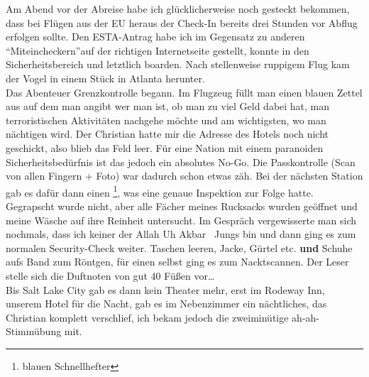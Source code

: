 Am Abend vor der Abreise habe ich glücklicherweise noch gesteckt bekommen, dass bei Flügen aus der EU heraus der Check-In bereits drei Stunden vor Abflug erfolgen sollte.
Den ESTA-Antrag habe ich \textendash im Gegensatz zu anderen \textquotedblleft Mit\-ein\-checkern\textquotedblright \textendash auf der richtigen Internetseite gestellt, konnte in den Sicherheitsbereich und letztlich boarden.
Nach stellenweise ruppigem Flug kam der Vogel in einem Stück in Atlanta herunter.\\

Das Abenteuer Grenzkontrolle begann.
Im Flugzeug füllt man einen blauen Zettel aus auf dem man angibt wer man ist, ob man zu viel Geld dabei hat, man terroristischen Aktivitäten nachgehe möchte und am wichtigsten, wo man nächtigen wird.
Der Christian hatte mir die Adresse des Hotels noch nicht geschickt, also blieb das Feld leer.
Für eine Nation mit einem paranoiden Sicherheitsbedürfnis ist das jedoch ein absolutes No-Go.
Die Passkontrolle (Scan von allen Fingern + Foto) war dadurch schon etwas zäh.
Bei der nächsten Station gab es dafür dann einen \footnote{blauen Schnellhefter}, was eine genaue Inspektion zur Folge hatte.
Gegrapscht wurde nicht, aber alle Fächer meines Rucksacks wurden geöffnet und meine Wäsche auf ihre Reinheit untersucht.
Im Gespräch vergewisserte man sich nochmals, dass ich keiner der \glqq Allah Uh Akbar \grqq\, Jungs bin und dann ging es zum normalen Security-Check weiter.
Taschen leeren, Jacke, Gürtel etc. \textbf{und} Schuhe aufs Band zum Röntgen, für einen selbst ging es zum Nacktscannen.
Der Leser stelle sich die Duftnoten von gut 40 Füßen vor\dots\\

Bis Salt Lake City gab es dann kein Theater mehr, erst im Rodeway Inn, unserem Hotel für die Nacht, gab es im Nebenzimmer ein nächtliches, das Christian komplett verschlief, ich bekam jedoch die zweiminütige ah-ah-Stimmübung mit.
